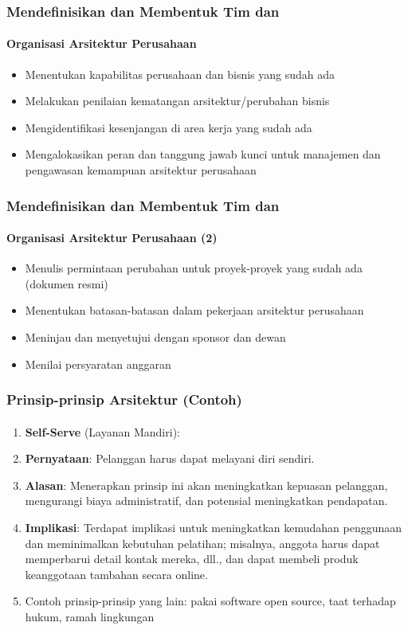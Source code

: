 \documentclass[aspectratio=169, table]{beamer}
\begin{document}
	\begin{frame}
		\frametitle{Mendefinisikan dan Membentuk Tim dan}
		\framesubtitle{Organisasi Arsitektur Perusahaan}
		\begin{itemize}
			\item Menentukan kapabilitas perusahaan dan bisnis yang sudah ada
			\item Melakukan penilaian kematangan arsitektur/perubahan bisnis
			\item Mengidentifikasi kesenjangan di area kerja yang sudah ada
			\item Mengalokasikan peran dan tanggung jawab kunci untuk manajemen dan pengawasan kemampuan arsitektur perusahaan
		\end{itemize}
	\end{frame}

	\begin{frame}
		\frametitle{Mendefinisikan dan Membentuk Tim dan}
		\framesubtitle{Organisasi  Arsitektur Perusahaan (2)}
		\begin{itemize}
			\item Menulis permintaan perubahan untuk proyek-proyek yang sudah ada (dokumen resmi)
			\item Menentukan batasan-batasan dalam pekerjaan arsitektur perusahaan
			\item Meninjau dan menyetujui dengan sponsor dan dewan
			\item Menilai persyaratan anggaran
		\end{itemize}
	\end{frame}

	\begin{frame}
		\frametitle{Prinsip-prinsip Arsitektur (Contoh)}
		\framesubtitle{\hspace{1cm}}
    \vspace{20pt}
		\begin{enumerate}
			\item \textbf{Self-Serve} (Layanan Mandiri):
			\item \textbf{Pernyataan}: Pelanggan harus dapat melayani diri sendiri.
			\item \textbf{Alasan}: Menerapkan prinsip ini akan meningkatkan kepuasan pelanggan, mengurangi biaya administratif, dan potensial meningkatkan pendapatan.
			\item \textbf{Implikasi}: Terdapat implikasi untuk meningkatkan kemudahan penggunaan dan meminimalkan kebutuhan pelatihan; misalnya, anggota harus dapat memperbarui detail kontak mereka, dll., dan dapat membeli produk keanggotaan tambahan secara online.
			\item Contoh prinsip-prinsip yang lain: pakai software open source, taat terhadap hukum, ramah lingkungan
		\end{enumerate}
	\end{frame}
\end{document}
